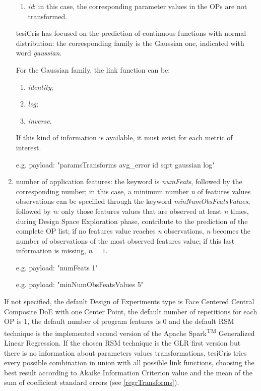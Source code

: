 \begin{enumerate}
\begin{enumerate}
        \item \textit{id}: in this case, the corresponding parameter values in the OPs are not transformed.
    
    \end{enumerate}
    
    tesiCris has focused on the prediction of continuous functions with normal distribution: the corresponding family is the Gaussian one, indicated with word \textit{gaussian}.
    
    For the Gaussian family, the link function can be:
    
    \begin{enumerate}
    
        \item \textit{identity};
        
        \item \textit{log};
        
        \item \textit{inverse}.
    
    \end{enumerate}
    
    If this kind of information is available, it must exist for each metric of interest.
    
    e.g. payload: "paramsTransforms avg\_error id sqrt gaussian log"
    
    \item number of application features: the keyword is \textit{numFeats}, followed by the corresponding number; in this case, a minimum number \textit{n} of features values observations can be specified through the keyword \textit{minNumObsFeatsValues}, followed by \textit{n}: only those features values that are observed at least \textit{n} times, during Design Space Exploration phase, contribute to the prediction of the complete OP list; if no features value reaches \textit{n} observations, \textit{n} becomes the number of observations of the most observed features value; if this last information is missing, $n = 1$.
    
    e.g. payload: "numFeats 1"
    
    e.g. payload: "minNumObsFeatsValues 5"

\end{enumerate}

If not specified, the default Design of Experiments type is Face Centered Central Composite DoE with one Center Point, the default number of repetitions for each OP is 1, the default number of program features is 0 and the default RSM technique is the implemented second version of the Apache Spark\textsuperscript{TM} Generalized Linear Regression. If the chosen RSM technique is the GLR first version but there is no information about parameters values transformations, tesiCris tries every possible combination in union with all possible link functions, choosing the best result according to Akaike Information Criterion value and the mean of the sum of coefficient standard errors (see \ref{regrTransforms}).

